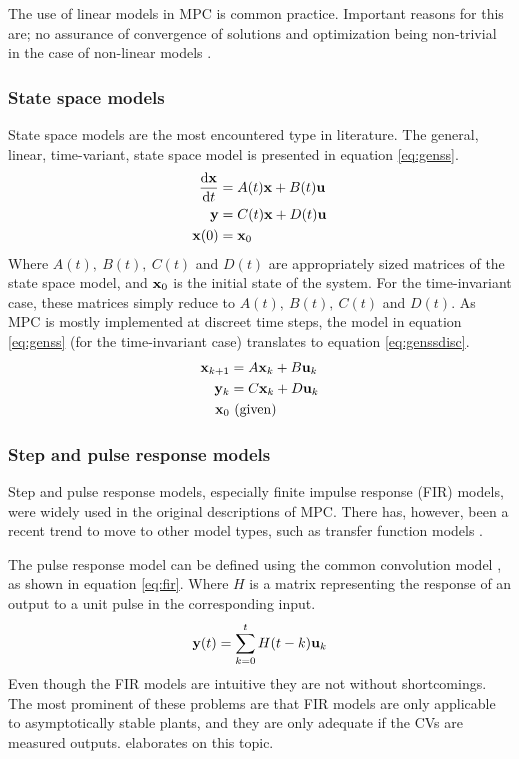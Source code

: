 The use of linear models in MPC is common practice.
Important reasons for this are; no assurance of convergence of solutions and optimization being non-trivial in the case of non-linear models \citep[17]{rossiter}.
\subsubsection{State space models}
State space models are the most encountered type in literature.
The general, linear, time-variant, state space model is presented in equation \ref{eq:genss}.
\begin{align}
  \label{eq:genss}
  \frac{\mathrm{d}{\bf {x}}}{\mathrm{d}t} &= A(t){\bf {x}} + B(t){\bf {u}} \notag \\
  {\bf {y}} &= C(t){\bf {x}} + D(t){\bf {u}} \\
  {\bf {x}}(0) &= {\bf {x}}_0 \notag
\end{align}
Where $A(t),~B(t),~C(t)$ and $D(t)$ are appropriately sized matrices of the state space model, and ${\bf {x}}_0$ is the initial state of the system.
For the time-invariant case, these matrices simply reduce to $A(t),~B(t),~C(t)$ and $D(t)$. 
As MPC is mostly implemented at discreet time steps, the model in equation \ref{eq:genss} (for the time-invariant case) translates to equation \ref{eq:genssdisc}.
\begin{align}
  \label{eq:genssdisc}
  {\bf {x}}_{k+1} &= A{\bf {x}}_k + B{\bf {u}}_k \notag \\
  {\bf {y}}_k &= C{\bf {x}}_k + D{\bf {u}}_k \\
  {\bf {x}}_0 &~ \text{(given)} \notag
\end{align}

\subsubsection{Step and pulse response models}
Step and pulse response models, especially finite impulse response (FIR) models, were widely used in the original descriptions of MPC.
There has, however, been a recent trend to move to other model types, such as transfer function models .

The pulse response model can be defined using the common convolution model \citep[284]{luyben}, as shown in equation \ref{eq:fir}.
Where $H$ is a matrix representing the response of an output to a unit pulse in the corresponding input.
\begin{equation}
  \label{eq:fir}
  {\bf {y}}(t) = \sum^t_{k=0}H(t-k){\bf {u}}_k
\end{equation} 
Even though the FIR models are intuitive they are not without shortcomings.
The most prominent of these problems are that FIR models are only applicable to asymptotically stable plants, and they are only adequate if the CVs are measured outputs.
\citet[109]{maciejowskimpc} elaborates on this topic.

